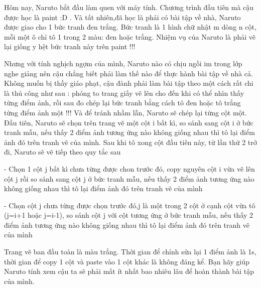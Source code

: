 Hôm nay, Naruto bắt đầu làm quen với máy tính. Chương trình đầu tiên mà cậu được học là paint :D . Và tất nhiên,đã học là phải có bài tập về nhà, Naruto được giao cho 1 bức tranh đen trắng. Bức tranh là 1 hình chữ nhật m dòng n cột, mỗi một ô chỉ tô 1 trong 2 màu: đen hoặc trắng. Nhiệm vụ của Naruto là phải vẽ lại giống y hệt bức tranh này trên paint !!!  

   Nhưng với tính nghịch ngợm của mình, Naruto nào có chịu ngồi im trong lớp nghe giảng nên cậu chẳng biết phải làm thế nào để thực hành bài tập về nhà cả. Không muốn bị thầy giáo phạt, cậu đành phải làm bài tập theo một cách rất chi là thủ công như sau : phóng to trang giấy vẽ lên cho đến khi có thể nhìn thấy từng điểm ảnh, rồi sau đo chép lại bức tranh bằng cách tô đen hoặc tô trắng từng điểm ảnh một !!! Và để tránh nhầm lẫn, Naruto sẽ chép lại từng cột một. Đầu tiên, Naruto sẽ chọn trên trang vẽ một cột i bất kì, so sánh sang cột i ở bức tranh mẫu, nếu thấy 2 điểm ảnh tương ứng nào không giống nhau thì tô lại điểm ảnh đó trên tranh vẽ của mình. Sau khi tô xong cột đầu tiên này, từ lần thứ 2 trở đi, Naruto sẽ vẽ tiếp theo quy tắc sau  

   - Chọn 1 cột j bất kì chưa từng được chon trước đó, copy nguyên cột i vừa vẽ lên cột j rồi so sánh sang cột j ở bức tranh mẫu, nếu thấy 2 điểm ảnh tương ứng nào không giống nhau thì tô lại điểm ảnh đó trên tranh vẽ của mình  

   - Chọn cột j chưa từng được chọn trước đó,j là một trong 2 cột ở cạnh cột vừa tô (j=i+1 hoặc j=i-1), so sánh cột j với cột tương ứng ở bức tranh mẫu, nếu thấy 2 điểm ảnh tương ứng nào không giống nhau thì tô lại điểm ảnh đó trên tranh vẽ của mình  

   Trang vẽ ban đầu toàn là màu trắng. Thời gian để chỉnh sửa lại 1 điểm ảnh là 1s, thời gian để copy 1 cột và paste vào 1 cột khác là không đáng kể. Bạn hãy giúp Naruto tính xem cậu ta sẽ phải mất ít nhất bao nhiêu lâu để hoàn thành bài tập của mình.